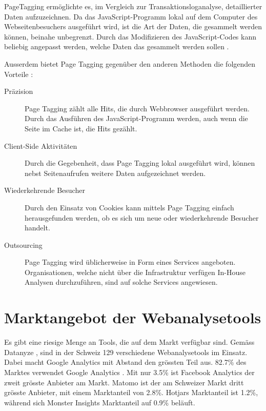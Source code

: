 PageTagging ermöglichte es, im Vergleich zur Transaktionsloganalyse, detaillierter Daten aufzuzeichnen. Da das JavaScript-Programm lokal auf dem Computer des Webseitenbesuchers ausgeführt wird, ist die Art der Daten, die gesammelt werden können, beinahe unbegrenzt. Durch das Modifizieren des JavaScript-Codes kann beliebig angepasst werden, welche Daten das gesammelt werden sollen \parencite[S. 3]{waisberg2009webShort}. 

Ausserdem bietet Page Tagging gegenüber den anderen Methoden die folgenden Vorteile \parencite[S. 174]{nakatani2011toolselectionmethod}:

\begin{description}
  \item[Präzision] Page Tagging zählt alle Hits, die durch Webbrowser ausgeführt werden. Durch das Ausführen des JavaScript-Programm werden, auch wenn die Seite im Cache ist, die Hits gezählt.
  \item[Client-Side Aktivitäten] Durch die Gegebenheit, dass Page Tagging lokal ausgeführt wird, können nebst Seitenaufrufen weitere Daten aufgezeichnet werden.
  \item[Wiederkehrende Besucher] Durch den Einsatz von Cookies kann mittels Page Tagging einfach herausgefunden werden, ob es sich um neue oder wiederkehrende Besucher handelt.
  \item[Outsourcing] Page Tagging wird üblicherweise in Form eines Services angeboten. Organisationen, welche nicht über die Infrastruktur verfügen In-House Analysen durchzuführen, sind auf solche Services angewiesen.
\end{description}


\newpage
\section{Marktangebot der Webanalysetools}\label{sec:marktangebotwebanalyse}
Es gibt eine riesige Menge an Tools, die auf dem Markt verfügbar sind. Gemäss Datanyze \parencite*{datanyzeSwitzerlandWebanalytics}, sind in der Schweiz 129 verschiedene Webanalysetools im Einsatz. Dabei macht Google Analytics mit Abstand den grössten Teil aus. 82.7\% des Marktes verwendet Google Analytics . Mit nur 3.5\% ist Facebook Analytics der zweit grösste Anbieter am Markt. Matomo ist der am Schweizer Markt dritt grösste Anbieter, mit einem Marktanteil von 2.8\%. Hotjars Marktanteil ist 1.2\%, während sich Monster Insights Marktanteil auf 0.9\% beläuft. 

